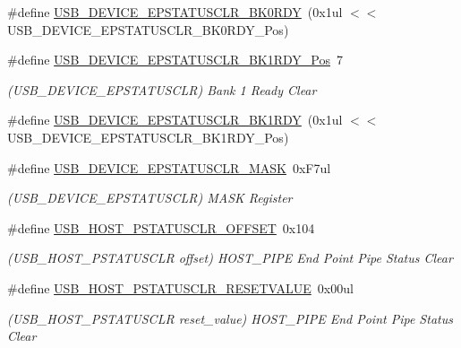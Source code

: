 \begin{DoxyCompactItemize}
\#define \mbox{\hyperlink{group___s_a_m_d21___u_s_b_ga9be84689ce75f5bcedcd05e9e2f148d0}{U\+S\+B\+\_\+\+D\+E\+V\+I\+C\+E\+\_\+\+E\+P\+S\+T\+A\+T\+U\+S\+C\+L\+R\+\_\+\+B\+K0\+R\+DY}}~(0x1ul $<$$<$ U\+S\+B\+\_\+\+D\+E\+V\+I\+C\+E\+\_\+\+E\+P\+S\+T\+A\+T\+U\+S\+C\+L\+R\+\_\+\+B\+K0\+R\+D\+Y\+\_\+\+Pos)
\item 
\#define \mbox{\hyperlink{group___s_a_m_d21___u_s_b_ga6528b261f4ba46192c788d7a2641557a}{U\+S\+B\+\_\+\+D\+E\+V\+I\+C\+E\+\_\+\+E\+P\+S\+T\+A\+T\+U\+S\+C\+L\+R\+\_\+\+B\+K1\+R\+D\+Y\+\_\+\+Pos}}~7
\begin{DoxyCompactList}\small\item\em (U\+S\+B\+\_\+\+D\+E\+V\+I\+C\+E\+\_\+\+E\+P\+S\+T\+A\+T\+U\+S\+C\+LR) Bank 1 Ready Clear \end{DoxyCompactList}\item 
\#define \mbox{\hyperlink{group___s_a_m_d21___u_s_b_gaa8e450fe7b9645333a9984ebbf211e71}{U\+S\+B\+\_\+\+D\+E\+V\+I\+C\+E\+\_\+\+E\+P\+S\+T\+A\+T\+U\+S\+C\+L\+R\+\_\+\+B\+K1\+R\+DY}}~(0x1ul $<$$<$ U\+S\+B\+\_\+\+D\+E\+V\+I\+C\+E\+\_\+\+E\+P\+S\+T\+A\+T\+U\+S\+C\+L\+R\+\_\+\+B\+K1\+R\+D\+Y\+\_\+\+Pos)
\item 
\#define \mbox{\hyperlink{group___s_a_m_d21___u_s_b_ga7541bd01b67281f768176f2d0e03cd97}{U\+S\+B\+\_\+\+D\+E\+V\+I\+C\+E\+\_\+\+E\+P\+S\+T\+A\+T\+U\+S\+C\+L\+R\+\_\+\+M\+A\+SK}}~0x\+F7ul
\begin{DoxyCompactList}\small\item\em (U\+S\+B\+\_\+\+D\+E\+V\+I\+C\+E\+\_\+\+E\+P\+S\+T\+A\+T\+U\+S\+C\+LR) M\+A\+SK Register \end{DoxyCompactList}\item 
\#define \mbox{\hyperlink{group___s_a_m_d21___u_s_b_ga92129ccf601aee20b48c49d623268f07}{U\+S\+B\+\_\+\+H\+O\+S\+T\+\_\+\+P\+S\+T\+A\+T\+U\+S\+C\+L\+R\+\_\+\+O\+F\+F\+S\+ET}}~0x104
\begin{DoxyCompactList}\small\item\em (U\+S\+B\+\_\+\+H\+O\+S\+T\+\_\+\+P\+S\+T\+A\+T\+U\+S\+C\+LR offset) H\+O\+S\+T\+\_\+\+P\+I\+PE End Point Pipe Status Clear \end{DoxyCompactList}\item 
\#define \mbox{\hyperlink{group___s_a_m_d21___u_s_b_gacaa82db7276caf9ad65dbd60cae53209}{U\+S\+B\+\_\+\+H\+O\+S\+T\+\_\+\+P\+S\+T\+A\+T\+U\+S\+C\+L\+R\+\_\+\+R\+E\+S\+E\+T\+V\+A\+L\+UE}}~0x00ul
\begin{DoxyCompactList}\small\item\em (U\+S\+B\+\_\+\+H\+O\+S\+T\+\_\+\+P\+S\+T\+A\+T\+U\+S\+C\+LR reset\+\_\+value) H\+O\+S\+T\+\_\+\+P\+I\+PE End Point Pipe Status Clear \end{DoxyCompactList}\item 

\end{DoxyCompactItemize}
